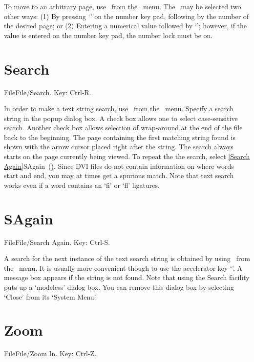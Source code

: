 To move to an arbitrary page, use \ from the
\ menu.  The \ may be selected two other
ways: (1) By pressing `\asterisk' on the number key pad, following by the
number of the desired page; or (2)  Entering a numerical value followed by
`'; however, if the value is entered on the number key pad, the
number lock must be on.

\newpage

\section{Search}{File}File/Search. Key: Ctrl-R.

In order to make a text string search, use \ from the
\ menu.  Specify a search string in the popup dialog box.  A
check box allows one to select case-sensitive search. Another check box
allows selection of wrap-around at the end of the file back to the
beginning.  The page containing the first matching string found is shown
with the arrow cursor placed right after the string.  The search always
starts on the page currently being viewed. To repeat the the search,
select \ref{Search Again}{SAgain}\ ().
   \medskip
Since DVI files do not contain information on where words start and
end, you may at times get a spurious match.  Note that text search
works even if a word contains an `fi' or `fl' ligatures.
   \bigskip

\section{SAgain}{File}File/Search Again. Key: Ctrl-S.

A search for the next instance of the text search string is obtained by
using \ from the \ menu.  It is usually more
convenient though to use the accelerator key `'.
A message box appears if the string is not found.
    \medskip
Note that using the Search facility puts up a `modeless' dialog box.
You can remove this dialog box by selecting `Close' from its `System Menu'.

\newpage

\section{Zoom}{File}File/Zoom In. Key: Ctrl-Z.

